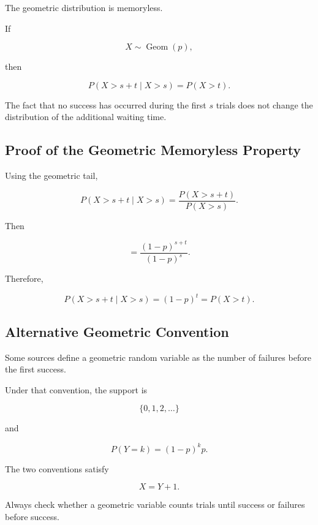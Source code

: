 The geometric distribution is memoryless.

\begin{theorem}
If

\[
X\sim\operatorname{Geom}(p),
\]

then

\[
\boxed{
P(X>s+t\mid X>s)
=
P(X>t).
}
\]
\end{theorem}

The fact that no success has occurred during the first \(s\) trials does
not change the distribution of the additional waiting time.

\subsection{Proof of the Geometric Memoryless Property}
\label{subsec:proof-geometric-memoryless}

Using the geometric tail,

\[
P(X>s+t\mid X>s)
=
\frac{P(X>s+t)}{P(X>s)}.
\]

Then

\[
=
\frac{(1-p)^{s+t}}{(1-p)^s}.
\]

Therefore,

\[
\boxed{
P(X>s+t\mid X>s)
=
(1-p)^t
=
P(X>t).
}
\]

\subsection{Alternative Geometric Convention}
\label{subsec:alternative-geometric-convention}

Some sources define a geometric random variable as the number of
failures before the first success.

Under that convention, the support is

\[
\{0,1,2,\ldots\}
\]

and

\[
\boxed{
P(Y=k)
=
(1-p)^kp.
}
\]

The two conventions satisfy

\[
\boxed{
X=Y+1.
}
\]

\begin{warningbox}
Always check whether a geometric variable counts trials until success
or failures before success.
\end{warningbox}

